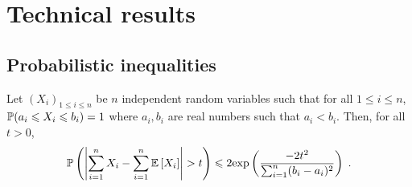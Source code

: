 \chapter{Technical results}
\minitoc

\section{Probabilistic inequalities}
\begin{shaded}
\begin{theorem}
\label{th:hoeffding}
Let $(X_i)_{1\leqslant i\leqslant n}$ be $n$ independent random variables such that for all $1\leqslant i\leqslant n$, $\mathbb{P}(a_i\leqslant X_i\leqslant b_i) = 1$ where $a_i, b_i$ are real numbers such that $a_i<b_i$. Then, for all $t>0$,
\[
\bP\left(\left|\sum_{i=1}^n X_i - \sum_{i=1}^n \bE\left[X_i\right]\right|>t\right)\leqslant 2\mathrm{exp}\left(\frac{-2t^2}{\sum_{i=1}^n(b_i-a_i)^2}\right)\eqsp.
\]
\end{theorem}
\end{shaded}
